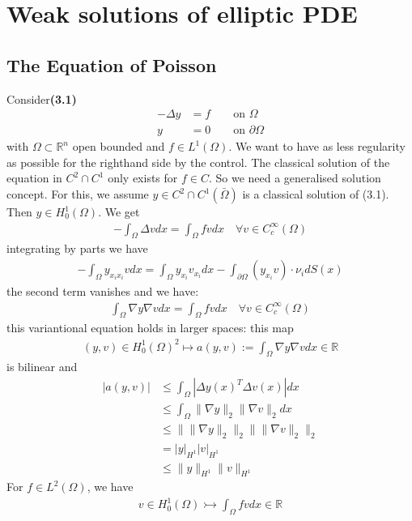 \section{Weak solutions of elliptic PDE}
\subsection{The Equation of Poisson}
Consider\textbf{(3.1)}
\begin{align*}
	-\Delta y &= f \qquad \text{on } \Omega\\
	y &= 0 \qquad \text{on } \partial \Omega
\end{align*}
with $\Omega \subset \mathbb{R}^n$ open bounded and $f \in L^1(\Omega)$. We want to have as less regularity as possible for the righthand side by the control. The classical solution of the equation in $C^2 \cap C^1$ only exists for $f \in C$. So we need a generalised solution concept. \quad
For this, we assume $y \in C^2 \cap C^1(\bar{\Omega})$ is a classical solution of (3.1). Then $y \in H^1_0(\Omega)$. We get 
\begin{align*}
	-\int_{\Omega} \Delta v dx = \int_\Omega fv dx\quad \forall v \in C_c^\infty(\Omega)
\end{align*}
integrating by parts we have
\begin{align*}
	-\int_{\Omega} y_{x_ix_i} v dx = \int_\Omega y_{x_i} v_{x_i} dx - \int_{\partial \Omega} (y_{x_i} v)\cdot \nu_i dS(x) 
\end{align*}
the second term vanishes and we have:
\begin{align*}
	\int_{\Omega} \nabla y \nabla v dx = \int_\Omega fv dx \quad \forall v \in C_c^\infty(\Omega)
\end{align*}
this variantional equation holds in larger spaces: this map
\begin{align*}
	(y, v) \in H^1_0(\Omega)^2 \mapsto a(y, v) := \int_{\Omega} \nabla y \nabla v dx \in \mathbb{R}
\end{align*}
is bilinear and 
\begin{align*}
	|a(y, v)| &\le \int_\Omega |\Delta y(x)^T \Delta v(x)|dx \\
	&\le \int_\Omega \|\nabla y\|_2 \|\nabla v\|_2 dx \\
	&\le \| \|\nabla y\|_2 \|_2 \| \|\nabla v\|_2 \|_2\\
	&= |y|_{H^1} |v|_{H^1}\\
	&\le \|y\|_{H^1} \|v\|_{H^1}
\end{align*}
For $f \in L^2(\Omega)$, we have
\begin{align*}
	v \in H_0^1(\Omega) \rightarrowtail \int_\Omega fv dx \in \mathbb{R}
\end{align*}
